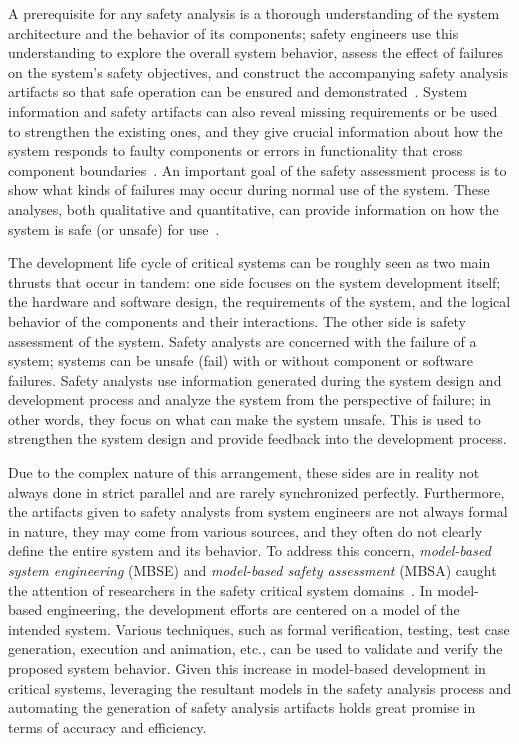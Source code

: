 A prerequisite for any safety analysis is a thorough understanding of the system architecture and the behavior of its components; safety engineers use this understanding to explore the overall system behavior, assess the effect of failures on the system's safety objectives, and construct the accompanying safety analysis artifacts so that safe operation can be ensured and demonstrated~\cite{SAE:ARP4761,SAE:ARP4754A}. System information and safety artifacts can also reveal missing requirements or be used to strengthen the existing ones, and they give crucial information about how the system responds to faulty components or errors in functionality that cross component boundaries~\cite{Bozzano:2010:DSA:1951720}.  An important goal of the safety assessment process is to show what kinds of failures may occur during normal use of the system. These analyses, both qualitative and quantitative, can provide information on how the system is safe (or unsafe) for use~\cite{roland1990system}.

The development life cycle of critical systems can be roughly seen as two main thrusts that occur in tandem: one side focuses on the system development itself; the hardware and software design, the requirements of the system, and the logical behavior of the components and their interactions. The other side is safety assessment of the system. Safety analysts are concerned with the failure of a system; systems can be unsafe (fail) with or without component or software failures. Safety analysts use information generated during the system design and development process and analyze the system from the perspective of failure; in other words, they focus on what can make the system unsafe. This is used to strengthen the system design and provide feedback into the development process.

Due to the complex nature of this arrangement, these sides are in reality not always done in strict parallel and are rarely synchronized perfectly. Furthermore, the artifacts given to safety analysts from system engineers are not always formal in nature, they may come from various sources, and they often do not clearly define the entire system and its behavior. To address this concern, \emph{model-based system engineering} (MBSE) and \emph{model-based safety assessment} (MBSA) caught the attention of researchers in the safety critical system domains~\cite{Joshi05:Dasc,CAV2015:BoCiGrMa,info17:HaLuHo,5979344,Gudemann:2010:FQQ:1909626.1909813}. In model-based engineering, the development efforts are centered on a model of the intended system. Various techniques, such as formal verification, testing, test case generation, execution and animation, etc., can be used to validate and verify the proposed system behavior. Given this increase in model-based development in critical systems, leveraging the resultant models in the safety analysis process and automating the generation of safety analysis artifacts holds great promise in terms of accuracy and efficiency. 

